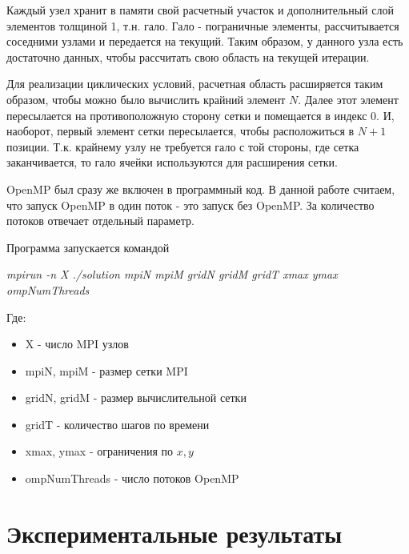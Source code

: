 \documentclass[12pt,a4paper]{scrartcl}
\begin{document}
Каждый узел хранит в памяти свой расчетный участок и дополнительный слой элементов толщиной 1, т.н. гало. Гало - пограничные элементы,
рассчитывается соседними узлами и передается на текущий.
Таким образом, у данного узла есть достаточно данных, чтобы рассчитать свою область на текущей итерации.

Для реализации циклических условий, расчетная область расширяется таким образом, чтобы можно было вычислить крайний элемент $N$.
Далее этот элемент пересылается на противоположную сторону сетки и помещается в индекс $0$. И, наоборот, первый элемент сетки
пересылается, чтобы расположиться в $N+1$ позиции. Т.к. крайнему узлу не требуется гало с той стороны, где сетка заканчивается,
то гало ячейки используются для расширения сетки.

OpenMP был сразу же включен в программный код. В данной работе считаем, что запуск OpenMP в один поток - это запуск без OpenMP.
За количество потоков отвечает отдельный параметр.

Программа запускается командой

\begin{center}
\small
\textit{mpirun -n X ./solution mpiN mpiM gridN gridM gridT xmax ymax ompNumThreads}
\end{center}

Где:
\begin{itemize}
    \item X - число MPI узлов
    \item mpiN, mpiM - размер сетки MPI
    \item gridN, gridM - размер вычислительной сетки
    \item gridT - количество шагов по времени
    \item xmax, ymax - ограничения по $x, y$
    \item ompNumThreads - число потоков OpenMP
\end{itemize}

\newpage

\section{Экспериментальные результаты}
\end{document}
